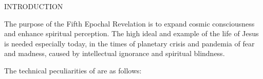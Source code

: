 \newpage
\thispagestyle{empty}

\makeatletter
{}%
\makeatother

\begin{center}
\bibpapertitlefont
INTRODUCTION
\end{center}


The purpose of the Fifth Epochal Revelation is to expand cosmic consciousness and enhance spiritual perception.
The high ideal and example of the life of Jesus is needed especially today,
in the times of planetary crisis and pandemia of fear and madness, caused by intellectual ignorance and spiritual blindness.

The technical peculiarities of  are as follows:


